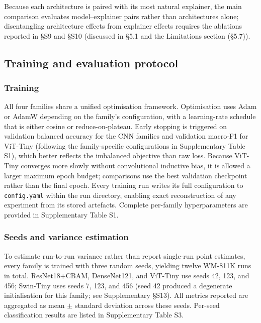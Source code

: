 \documentclass[11pt,a4paper]{article}
\begin{document}
Because each architecture is paired with its most natural explainer, the main comparison evaluates model--explainer pairs rather than architectures alone; disentangling architecture effects from explainer effects requires the ablations reported in \S{}S9 and \S{}S10 (discussed in \S{}5.1 and the Limitations section (\S{}5.7)).


\subsection{Training and evaluation protocol}

\subsubsection{Training}

All four families share a unified optimisation framework. Optimisation uses Adam or AdamW depending on the family's configuration, with a learning-rate schedule that is either cosine or reduce-on-plateau. Early stopping is triggered on validation balanced accuracy for the CNN families and validation macro-F1 for ViT-Tiny (following the family-specific configurations in Supplementary Table S1), which better reflects the imbalanced objective than raw loss. Because ViT-Tiny converges more slowly without convolutional inductive bias, it is allowed a larger maximum epoch budget; comparisons use the best validation checkpoint rather than the final epoch. Every training run writes its full configuration to \texttt{config.yaml} within the run directory, enabling exact reconstruction of any experiment from its stored artefacts. Complete per-family hyperparameters are provided in Supplementary
Table S1.

\subsubsection{Seeds and variance estimation}

To estimate run-to-run variance rather than report single-run point estimates, every family is trained with three random seeds, yielding twelve WM-811K runs in total. ResNet18+CBAM, DenseNet121, and ViT-Tiny use seeds 42, 123, and 456; Swin-Tiny uses seeds 7, 123, and 456 (seed 42 produced a degenerate initialisation for this family; see Supplementary \S{}S13). All metrics reported are aggregated as mean $\pm$ standard deviation across these seeds. Per-seed classification results are listed in Supplementary Table S3.
\end{document}
